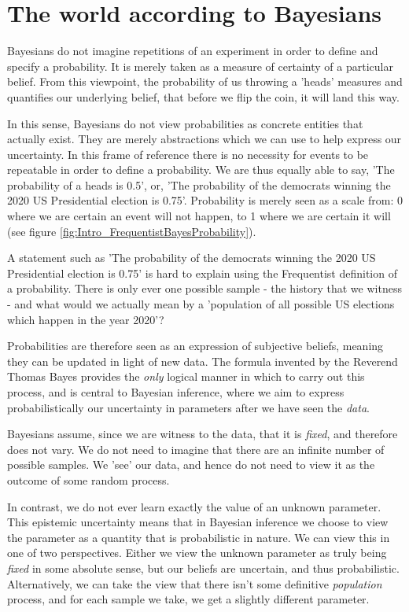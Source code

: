 \documentclass[11pt,fullpage]{book}
\begin{document}
\section{The world according to Bayesians}
Bayesians do not imagine repetitions of an experiment in order to define and specify a probability. It is merely taken as a measure of certainty of a particular belief. From this viewpoint, the probability of us throwing a 'heads' measures and quantifies our underlying belief, that before we flip the coin, it will land this way. 

In this sense, Bayesians do not view probabilities as concrete entities that actually exist. They are merely abstractions which we can use to help express our uncertainty. In this frame of reference there is no necessity for events to be repeatable in order to define a probability. We are thus equally able to say, 'The probability of a heads is 0.5', or, 'The probability of the democrats winning the 2020 US Presidential election is 0.75'. Probability is merely seen as a scale from: 0 where we are certain an event will not happen, to 1 where we are certain it will (see figure \ref{fig:Intro_FrequentistBayesProbability}). 

A statement such as 'The probability of the democrats winning the 2020 US Presidential election is 0.75' is hard to explain using the Frequentist definition of a probability. There is only ever one possible sample - the history that we witness - and what would we actually mean by a 'population of all possible US elections which happen in the year 2020'? 

Probabilities are therefore seen as an expression of subjective beliefs, meaning they can be updated in light of new data. The formula invented by the Reverend Thomas Bayes provides the \textit{only} logical manner in which to carry out this process, and is central to Bayesian inference, where we aim to express probabilistically our uncertainty in parameters after we have seen the \textit{data}. 

Bayesians assume, since we are witness to the data, that it is \textit{fixed}, and therefore does not vary. We do not need to imagine that there are an infinite number of possible samples. We 'see' our data, and hence do not need to view it as the outcome of some random process.

In contrast, we do not ever learn exactly the value of an unknown parameter. This epistemic uncertainty means that in Bayesian inference we choose to view the parameter as a quantity that is probabilistic in nature. We can view this in one of two perspectives. Either we view the unknown parameter as truly being \textit{fixed} in some absolute sense, but our beliefs are uncertain, and thus probabilistic. Alternatively, we can take the view that there isn't some definitive \textit{population} process, and for each sample we take, we get a slightly different parameter.
\end{document}
